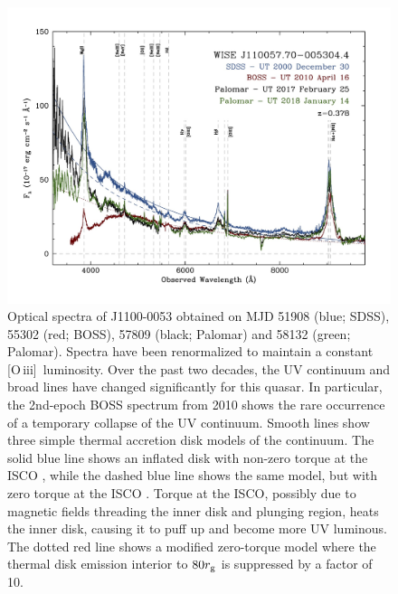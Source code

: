 \documentclass[a4paper,fleqn,usenatbib]{mnras}
\begin{document}
\begin{figure}
  \centering
  \includegraphics[width=17.00cm, trim=0.0cm 0.0cm 0.0cm 0.0cm, clip]
  {../plots/spectra/w1100m0053_sdss_palomar2.jpg}
\vspace{-16pt}
  \caption[]{
    Optical spectra of J1100-0053 obtained on MJD 51908 (blue; SDSS),
    55302 (red; BOSS), 57809 (black; Palomar) and 58132 (green;
    Palomar). Spectra have been renormalized to maintain a constant
    [O\,{\sc iii}]\ luminosity. Over the past two decades, the UV
    continuum and broad lines have changed significantly for this quasar.
    In particular, the 2nd-epoch BOSS spectrum from 2010 shows the rare
    occurrence of a temporary collapse of the UV continuum.  Smooth lines
    show three simple thermal accretion disk models of the continuum.  The
    solid blue line shows an inflated disk with non-zero torque at the
    ISCO \cite[e.g.,][]{Sirko_Goodman2003}, while the dashed blue line
    shows the same model, but with zero torque at the ISCO \cite[i.e.,
    equivalent to a simple $\alpha$-disk model,][]{SS73}.  Torque at the
    ISCO, possibly due to magnetic fields threading the inner disk and
    plunging region, heats the inner disk, causing it to puff up and
    become more UV luminous.  The dotted red line shows a modified
    zero-torque model where the thermal disk emission interior to $80
    r_{\rm g}$ is suppressed by a factor of 10.}
  \label{fig:J110057_spectra}
\end{figure}
\end{document}
